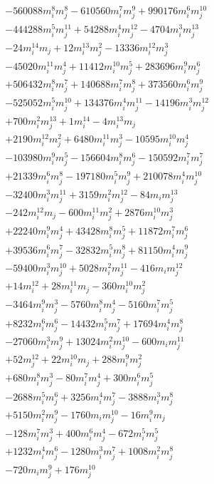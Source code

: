 {\begin{align*}
&-560088m_i^{8}m_j^{8}-610560m_i^{7}m_j^{9}+990176m_i^{6}m_j^{10}\\
&-444288m_i^{5}m_j^{11}+54288m_i^{4}m_j^{12}-4704m_i^{3}m_j^{13}\\
&-24m_i^{14}m_j+12m_i^{13}m_j^{2}-13336m_i^{12}m_j^{3}\\
&-45020m_i^{11}m_j^{4}+11412m_i^{10}m_j^{5}+283696m_i^{9}m_j^{6}\\
&+506432m_i^{8}m_j^{7}+140688m_i^{7}m_j^{8}+373560m_i^{6}m_j^{9}\\
&-525052m_i^{5}m_j^{10}+134376m_i^{4}m_j^{11}-14196m_i^{3}m_j^{12}\\
&+700m_i^{2}m_j^{13}+1m_i^{14}-4m_i^{13}m_j\\
&+2190m_i^{12}m_j^{2}+6480m_i^{11}m_j^{3}-10595m_i^{10}m_j^{4}\\
&-103980m_i^{9}m_j^{5}-156604m_i^{8}m_j^{6}-150592m_i^{7}m_j^{7}\\
&+21339m_i^{6}m_j^{8}-197180m_i^{5}m_j^{9}+210078m_i^{4}m_j^{10}\\
&-32400m_i^{3}m_j^{11}+3159m_i^{2}m_j^{12}-84m_im_j^{13}\\
&-242m_i^{12}m_j-600m_i^{11}m_j^{2}+2876m_i^{10}m_j^{3}\\
&+22240m_i^{9}m_j^{4}+43428m_i^{8}m_j^{5}+11872m_i^{7}m_j^{6}\\
&+39536m_i^{6}m_j^{7}-32832m_i^{5}m_j^{8}+81150m_i^{4}m_j^{9}\\
&-59400m_i^{3}m_j^{10}+5028m_i^{2}m_j^{11}-416m_im_j^{12}\\
&+14m_i^{12}+28m_i^{11}m_j-360m_i^{10}m_j^{2}\\
&-3464m_i^{9}m_j^{3}-5760m_i^{8}m_j^{4}-5160m_i^{7}m_j^{5}\\
&+8232m_i^{6}m_j^{6}-14432m_i^{5}m_j^{7}+17694m_i^{4}m_j^{8}\\
&-27060m_i^{3}m_j^{9}+13024m_i^{2}m_j^{10}-600m_im_j^{11}\\
&+52m_j^{12}+22m_i^{10}m_j+288m_i^{9}m_j^{2}\\
&+680m_i^{8}m_j^{3}-80m_i^{7}m_j^{4}+300m_i^{6}m_j^{5}\\
&-2688m_i^{5}m_j^{6}+3256m_i^{4}m_j^{7}-3888m_i^{3}m_j^{8}\\
&+5150m_i^{2}m_j^{9}-1760m_im_j^{10}-16m_i^{9}m_j\\
&-128m_i^{7}m_j^{3}+400m_i^{6}m_j^{4}-672m_i^{5}m_j^{5}\\
&+1232m_i^{4}m_j^{6}-1280m_i^{3}m_j^{7}+1008m_i^{2}m_j^{8}\\
&-720m_im_j^{9}+176m_j^{10}
\end{align*}
}

